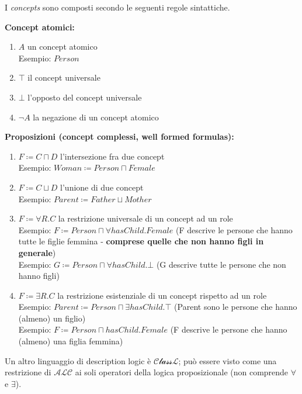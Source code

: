 \begin{fdefinition}
I \textit{concepts} sono composti secondo le seguenti regole sintattiche.

\textbf{Concept atomici:}
\begin{enumerate}
\item $A$ un concept atomico \\ Esempio: $Person$
\item $\top$ il concept universale
\item $\bot$ l'opposto del concept universale
\item $\lnot A$ la negazione di un concept atomico
\end{enumerate}
\textbf{Proposizioni (concept complessi, well formed formulas):}
\begin{enumerate}
\item $F \coloneqq C \sqcap D$ l'intersezione fra due concept \\ Esempio: $Woman \coloneqq Person \sqcap Female$
\item $F \coloneqq C \sqcup D$ l'unione di due concept \\ Esempio: $Parent \coloneqq Father \sqcup Mother$
\item $F \coloneqq \forall R. C$ la restrizione universale di un concept ad un role \\ Esempio: $F \coloneqq Person \sqcap \forall hasChild. Female$ (F descrive le persone che hanno tutte le figlie femmina - \textbf{comprese quelle che non hanno figli in generale})\\ Esempio: $G \coloneqq Person \sqcap \forall hasChild.\bot$ (G descrive tutte le persone che non hanno figli)
\item $F \coloneqq \exists R. C$ la restrizione esistenziale di un concept rispetto ad un role \\ Esempio: $Parent \coloneqq Person \sqcap \exists hasChild.\top$ (Parent sono le persone che hanno (almeno) un figlio) \\ Esempio: $F \coloneqq Person \sqcap hasChild. Female$ (F descrive le persone che hanno (almeno) una figlia femmina)
\end{enumerate}
\end{fdefinition}

Un altro linguaggio di description logic è $\mathscr{ClassL}$; può essere visto come una restrizione di $\mathscr{ALC}$ ai soli operatori della logica proposizionale (non comprende $\forall$ e $\exists$).

